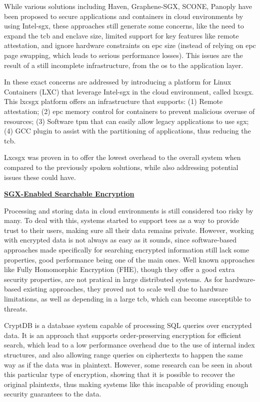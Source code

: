 While various solutions including Haven, Graphene-SGX, SCONE, Panoply have been proposed to secure applications and containers in cloud environments by using Intel-\gls{sgx}, these approaches still generate some concerns, like the need to expand the \gls{tcb} and enclave size, limited support for key features like remote attestation, and ignore hardware constraints on \gls{epc} size (instead of relying on \gls{epc} page swapping, which leads to serious performance losses). 
This issues are the result of a still incomplete infrastructure, from the \gls{os} to the application layer. 

In \cite{lxcsgxPaper} these exact concerns are addressed by introducing a platform for Linux Containers (LXC) that leverage Intel-\gls{sgx} in the cloud environment, called lxcsgx. 
This lxcsgx platform offers an infrastructure that supports: (1) Remote attestation; (2) \gls{epc} memory control for containers to prevent malicious overuse of resources; (3) Software \gls{tpm} that can easily allow legacy applications to use \gls{sgx}; (4) GCC plugin to assist with the partitioning of applications, thus reducing the \gls{tcb}.

Lxcsgx was proven in \cite{lxcsgxPaper} to offer the lowest overhead to the overall system when compared to the previously spoken solutions, while also addressing potential issues these could have.\newline


\underline{\textbf{SGX-Enabled Searchable Encryption}}


Processing and storing data in cloud environments is still considered too risky by many. To deal with this, systems started to support \gls{tee}s as a way to provide trust to their users, making sure all their data remains private. 
However, working with encrypted data is not always as easy as it sounds, since software-based approaches made specifically for searching encrypted information still lack some properties, good performance being one of the main ones. Well known approaches like Fully Homomorphic Encryption (FHE), though they offer a good extra security properties, are not pratical in large distributed systems. As for hardware-based existing approaches, they proved not to scale well due to hardware limitations, as well as depending in a large \gls{tcb}, which can become susceptible to threats.

CryptDB \cite{cryptDBPaper} is a database system capable of processing SQL queries over encrypted data. It is an approach that supports order-preserving encryption for efficient search, which lead to a low performance overhead due to the use of internal index structures, and also allowing range queries on ciphertexts to happen the same way as if the data was in plaintext. However, some research can be seen in \cite{naveedPaper} about this particular type of encryption, showing that it is possible to recover the original plaintexts, thus making systems like this incapable of providing enough security guarantees to the data.

